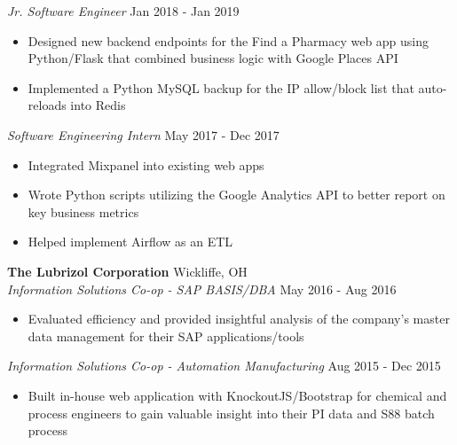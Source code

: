 \documentclass[a4paper]{article}
\begin{document}
\textit{Jr. Software Engineer} \hfill Jan 2018 - Jan 2019 \\
\vspace{-3mm}
\begin{itemize} \itemsep -0.25mm
    \item Designed new backend endpoints for the Find a Pharmacy web app using Python/Flask that combined
    business logic with Google Places API
    \item Implemented a Python MySQL backup for the IP allow/block list that auto-reloads into Redis
\end{itemize}
\vspace{-2mm}

\textit{Software Engineering Intern} \hfill May 2017 - Dec 2017 \\
\vspace{-3mm}
\begin{itemize} \itemsep -0.25mm
    \item Integrated Mixpanel into existing web apps
    \item Wrote Python scripts utilizing the Google Analytics API to better report on key business metrics
    \item Helped implement Airflow as an ETL
\end{itemize}
\vspace{-2mm}

\textbf{The Lubrizol Corporation} \hfill Wickliffe, OH \\
\textit{Information Solutions Co-op - SAP BASIS/DBA} \hfill May 2016 - Aug 2016 \\
\vspace{-2mm}
\begin{itemize} \itemsep -1mm
    \item Evaluated efficiency and provided insightful analysis of the company’s master data management for their
     SAP applications/tools 
\end{itemize}
\vspace{-2mm}

\textit{Information Solutions Co-op - Automation Manufacturing} \hfill Aug 2015 - Dec 2015 \\
\vspace{-3mm}
\begin{itemize} \itemsep -1mm
    \item Built in-house web application with KnockoutJS/Bootstrap for chemical and process engineers to gain valuable
    insight into their PI data and S88 batch process
\end{itemize}
\vspace{-2mm}
\end{document}
